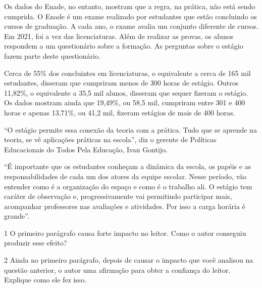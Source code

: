 \begin{myquote}
Os dados do Enade, no entanto, mostram que a regra, na prática, não está sendo
cumprida. O Enade é um exame realizado por estudantes que estão concluindo os
cursos de graduação. A cada ano, o exame avalia um conjunto diferente de
cursos. Em 2021, foi a vez das licenciaturas. Além de realizar as provas, os
alunos respondem a um questionário sobre a formação. As perguntas sobre o
estágio fazem parte deste questionário.

Cerca de 55\% dos concluintes em licenciaturas, o equivalente a cerca de 165
mil estudantes, disseram que cumpriram menos de 300 horas de estágio. Outros
11,82\%, o equivalente a 35,5 mil alunos, disseram que sequer fizeram o
estágio. Os dados mostram ainda que 19,49\%, ou 58,5 mil, cumpriram entre 301
e 400 horas e apenas 13,71\%, ou 41,2 mil, fizeram estágios de mais de 400
horas.

``O estágio permite essa conexão da teoria com a prática. Tudo que se aprende
na teoria, se vê aplicações práticas na escola'', diz o gerente de Políticas
Educacionais do Todos Pela Educação, Ivan Gontijo.

``É importante que os estudantes conheçam a dinâmica da escola, os papéis e as
responsabilidades de cada um dos atores da equipe escolar. Nesse período, vão
entender como é a organização do espaço e como é o trabalho ali. O estágio tem
caráter de observação e, progressivamente vai permitindo participar mais,
acompanhar professores nas avaliações e atividades. Por isso a carga horária é
grande''.


\end{myquote}

\num{1} O primeiro parágrafo causa forte impacto no leitor. Como o autor conseguiu 
produzir esse efeito? 


\num{2} Ainda no primeiro parágrafo, depois de causar o impacto que você analisou
na questão anterior, o autor uma afirmação para obter a confiança do leitor. 
Explique como ele fez isso. 


